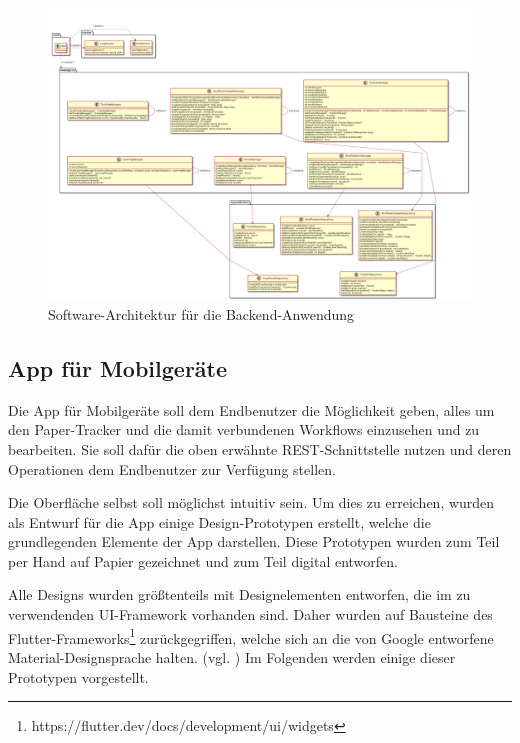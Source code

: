 \begin{landscape}
\begin{figure}
	\includegraphics[width=\textheight]{images/server_architecture.png}
	\centering
	\caption{Software-Architektur für die Backend-Anwendung}
	\label{fig:software-architecture}
\end{figure}
\end{landscape}

\FloatBarrier
\subsection{App für Mobilgeräte} \label{sec:app}

Die App für Mobilgeräte soll dem Endbenutzer die Möglichkeit geben, alles um den Paper-Tracker und die damit verbundenen Workflows einzusehen und zu bearbeiten.
Sie soll dafür die oben erwähnte \gls{REST}-Schnittstelle nutzen und deren Operationen dem Endbenutzer zur Verfügung stellen.

Die Oberfläche selbst soll möglichst intuitiv sein.
Um dies zu erreichen, wurden als Entwurf für die App einige Design-Prototypen erstellt, welche die grundlegenden Elemente der App darstellen.
Diese Prototypen wurden zum Teil per Hand auf Papier gezeichnet und zum Teil digital entworfen.

Alle Designs wurden größtenteils mit Designelementen entworfen, die im zu verwendenden \gls{UI}-Framework vorhanden sind.
Daher wurden auf Bausteine des
Flutter-Frameworks\footnote{https://flutter.dev/docs/development/ui/widgets} zurückgegriffen, welche
sich an die von Google entworfene Material-Designsprache halten. (vgl. \cite{Google2020})
Im Folgenden werden einige dieser Prototypen vorgestellt.


